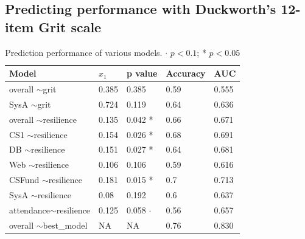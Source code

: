 \documentclass[sigconf]{acmart}
\begin{document}
\subsection{Predicting performance with Duckworth's 12-item Grit scale}

\begin{table}[]
\caption{Prediction performance of various models. $\cdot$ $p < 0.1$; * $p < 0.05$}
\begin{tabular}{lllll}
\hline
\multicolumn{1}{|l|}{\textbf{Model}} & \multicolumn{1}{l|}{\textbf{$x_1$}} & \multicolumn{1}{l|}{\textbf{p value}} & \multicolumn{1}{l|}{\textbf{Accuracy}} & \multicolumn{1}{l|}{\textbf{AUC}} \\ \hline
overall $\sim$grit                   & 0.385                              & 0.385                                 & 0.59                                   & 0.555                             \\
SysA $\sim$grit                      & 0.724                              & 0.119                                 & 0.64                                   & 0.636  \\ \hline
overall $\sim$resilience             & 0.135                              & 0.042 *                               & 0.66                                   & 0.671                             \\
CS1 $\sim$resilience                 & 0.154                              & 0.026 *                               & 0.68                                   & 0.691                             \\
DB $\sim$resilience                  & 0.151                              & 0.027 *                               & 0.64                                   & 0.681                             \\
Web $\sim$resilience                 & 0.106                              & 0.106                                 & 0.59                                   & 0.616                             \\
CSFund $\sim$resilience              & 0.181                              & 0.015 *                               & 0.7                                    & 0.713                             \\
SysA $\sim$resilience                & 0.08                               & 0.192                                 & 0.6                                    & 0.637                             \\
attendance$\sim$resilience           & 0.125                              & 0.058 $\cdot$                               & 0.56                                   & 0.657                             \\ \hline
overall $\sim$best\_model            & NA                                 & NA                                    & 0.76                                   & 0.830                            
\end{tabular}
\label{tab:model_performance}
\end{table}
\end{document}
